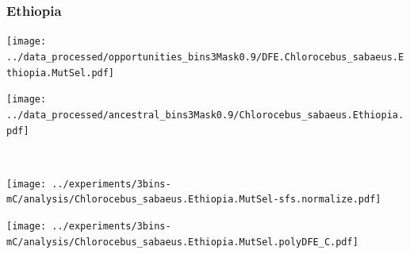\subsubsection{Ethiopia}

\begin{minipage}{0.49\linewidth}
    \texttt{[image: ../data\_processed/opportunities\_bins3Mask0.9/DFE.Chlorocebus\_sabaeus.Ethiopia.MutSel.pdf]}
\end{minipage}
\begin{minipage}{0.49\linewidth}
    \texttt{[image: ../data\_processed/ancestral\_bins3Mask0.9/Chlorocebus\_sabaeus.Ethiopia.pdf]}
\end{minipage}
\\
\begin{minipage}{0.49\linewidth}
    \texttt{[image: ../experiments/3bins-mC/analysis/Chlorocebus\_sabaeus.Ethiopia.MutSel-sfs.normalize.pdf]}
\end{minipage}
\begin{minipage}{0.4\linewidth}
    \texttt{[image: ../experiments/3bins-mC/analysis/Chlorocebus\_sabaeus.Ethiopia.MutSel.polyDFE\_C.pdf]}
\end{minipage}
